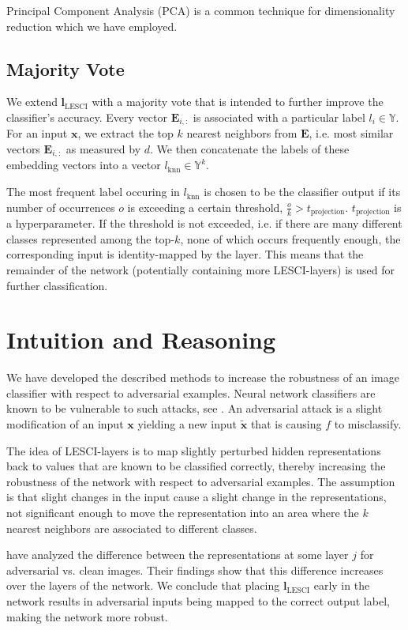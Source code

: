 \documentclass{article}
\begin{document}
Principal Component Analysis (PCA) is a common technique for dimensionality reduction which we have employed.

\subsection{Majority Vote}
We extend $\bm{l}_\text{LESCI}$ with a majority vote that is intended to further improve the classifier's accuracy.
Every vector $\bm{E}_{i,:}$ is associated with a particular label $l_i\in\mathbb{Y}$. For an input $\bm{x}$, we extract the top $k$ nearest neighbors from $\bm{E}$, i.e. most similar vectors $\bm{E}_{i,:}$ as measured by $d$.
We then concatenate the labels of these embedding vectors into a vector $l_\text{knn} \in \mathbb{Y}^k$. 

The most frequent label occuring in $l_\text{knn}$ is chosen to be the classifier output if its number of occurrences $o$ is exceeding a certain threshold, $\frac{o}{k}>t_\text{projection}$.
$t_\text{projection}$ is a hyperparameter.
If the threshold is not exceeded, i.e. if there are many different classes represented among the top-$k$, none of which occurs frequently enough, the corresponding input is identity-mapped by the layer.
This means that the remainder of the network (potentially containing more LESCI-layers) is used for further classification.

\section{Intuition and Reasoning}

We have developed the described methods to increase the robustness of an image classifier with respect to adversarial examples.
Neural network classifiers are known to be vulnerable to such attacks, see \cite{goodfellow-adversarial}.
An adversarial attack is a slight modification of an input $\bm{x}$ yielding a new input $\tilde{\bm{x}}$ that is causing $f$ to misclassify.

The idea of LESCI-layers is to map slightly perturbed hidden representations back to values that are known to be classified correctly, thereby increasing the robustness of the network with respect to adversarial examples.
The assumption is that slight changes in the input cause a slight change in the representations, not significant enough to move the representation into an area where the $k$ nearest neighbors are associated to different classes.

\cite{layerwise-perturbations} have analyzed the difference between the representations at some layer $j$ for adversarial vs. clean images.
Their findings show that this difference increases over the layers of the network.
We conclude that placing $\bm{l}_\text{LESCI}$ early in the network results in adversarial inputs being mapped to the correct output label, making the network more robust.
\end{document}
